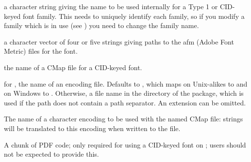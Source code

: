 %
\begin{Arguments}
\begin{ldescription}
\item[\code{family}] a character string giving the name to be used internally
for a Type 1 or CID-keyed font family.  This needs to uniquely
identify each family, so if you modify a family which is in use
(see ) you need to change the family name.
\item[\code{metrics}] a character vector of four or five strings giving paths
to the afm (Adobe Font Metric) files for the font.
\item[\code{cmap}] the name of a CMap file for a CID-keyed font.
\item[\code{encoding}] for , the name of an encoding file.
Defaults to , which maps on Unix-alikes to
 and on Windows to .
Otherwise, a file name in the  directory of the
 package, which is used if the path does not contain a
path separator.  An extension  can be omitted.
\item[\code{cmapEncoding}] 
The name of a character encoding to be used with the named CMap
file: strings will be translated to this encoding when written to
the file.
\item[\code{pdfresource}] A chunk of PDF code;  only required for using
a CID-keyed font on ; users should not be expected to
provide this.
\end{ldescription}
\end{Arguments}
%
